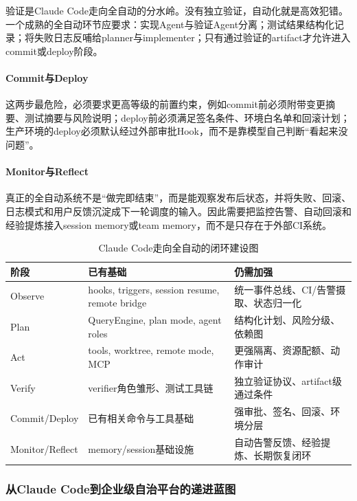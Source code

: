 \documentclass[12pt,a4paper]{article}
\begin{document}
验证是Claude Code走向全自动的分水岭。没有独立验证，自动化就是高效犯错。一个成熟的全自动环节应要求：实现Agent与验证Agent分离；测试结果结构化记录；将失败日志反哺给planner与implementer；只有通过验证的artifact才允许进入commit或deploy阶段。

\paragraph{Commit与Deploy}

这两步最危险，必须要求更高等级的前置约束，例如commit前必须附带变更摘要、测试摘要与风险说明；deploy前必须满足签名条件、环境白名单和回滚计划；生产环境的deploy必须默认经过外部审批Hook，而不是靠模型自己判断“看起来没问题”。

\paragraph{Monitor与Reflect}

真正的全自动系统不是“做完即结束”，而是能观察发布后状态，并将失败、回滚、日志模式和用户反馈沉淀成下一轮调度的输入。因此需要把监控告警、自动回滚和经验提炼接入session memory或team memory，而不是只存在于外部CI系统。

\begin{table}[H]
\centering
\caption{Claude Code走向全自动的闭环建设图}
\begin{tabular}{p{2.3cm}p{4.1cm}p{5.6cm}}
\toprule
\textbf{阶段} & \textbf{已有基础} & \textbf{仍需加强} \\
\midrule
Observe & hooks, triggers, session resume, remote bridge & 统一事件总线、CI/告警摄取、状态归一化 \\
Plan & QueryEngine, plan mode, agent roles & 结构化计划、风险分级、依赖图 \\
Act & tools, worktree, remote mode, MCP & 更强隔离、资源配额、动作审计 \\
Verify & verifier角色雏形、测试工具链 & 独立验证协议、artifact级通过条件 \\
Commit/Deploy & 已有相关命令与工具基础 & 强审批、签名、回滚、环境分层 \\
Monitor/Reflect & memory/session基础设施 & 自动告警反馈、经验提炼、长期恢复闭环 \\
\bottomrule
\end{tabular}
\end{table}

\subsubsection{从Claude Code到企业级自治平台的递进蓝图}
\end{document}
